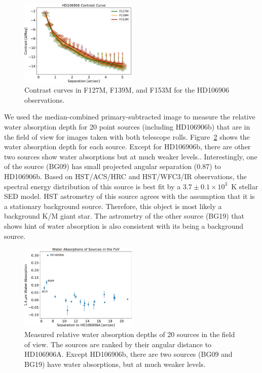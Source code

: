 \documentclass[twocolumn]{aastex62}
\begin{document}
\begin{figure}
  \centering
  \includegraphics[width=0.5\textwidth]{figures/contrast_curve.pdf}
  \caption{Contrast curves in F127M, F139M, and F153M for the HD106906 observations.}
  \label{fig:contrast_curve}
\end{figure}

We used the median-combined primary-subtracted image to measure the relative water absorption depth for 20 point sources (including HD106906b) that are in the field of view for images taken with both telescope rolls. Figure~\ref{fig:backgroundsources} shows the water absorption depth for each source. Except for HD106906b, there are other two sources show water absorptions but at much weaker levels.. Interestingly, one of the source (BG09) has small projected angular separation (0.87\arcsec) to HD106906b.  Based on HST/ACS/HRC and HST/WFC3/IR observations, the spectral energy distribution of this source is best fit by a $3.7\pm0.1\times10^{3}$~K stellar SED model. HST astrometry of this source agrees with the assumption that it is a stationary background source. Therefore, this object is most likely a background K/M giant star. The astrometry of the other source (BG19) that shows hint of water absorption is also consistent with its being a background source.

\begin{figure}
  \centering
  \includegraphics[width=0.5\textwidth]{figures/bck_waterdepth.pdf}
  \caption{Measured relative water absorption depths of 20 sources in the field of view. The sources are ranked by their angular distance to HD106906A. Except HD106906b, there are two sources (BG09 and BG19) have water absorptions, but at much weaker levels.}
  \label{fig:backgroundsources}
\end{figure}
\end{document}
